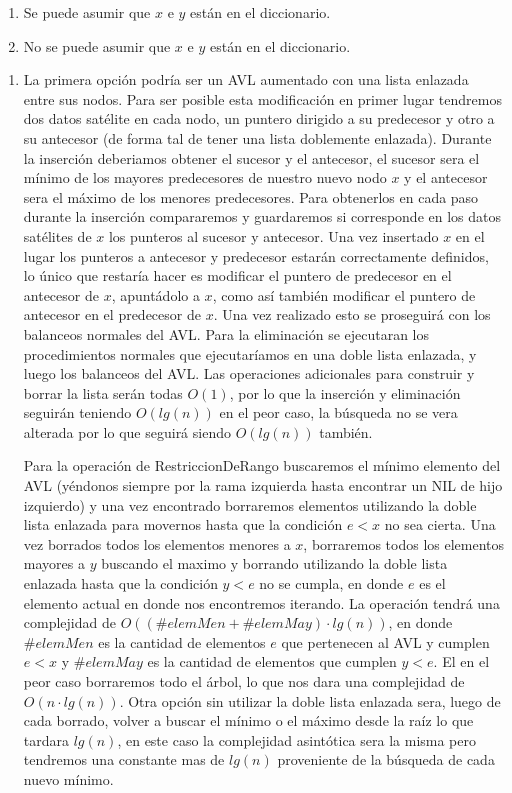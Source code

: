 \documentclass[10pt, a4paper]{article}
\begin{document}
\begin{enumerate}
 \item Se puede asumir que $x$ e $y$ est\'an en el diccionario. 
 \item No se puede asumir que $x$ e $y$ est\'an en el diccionario. 
\end{enumerate}

\begin{enumerate}
 \item La primera opci\'on podr\'ia ser un AVL aumentado con una lista enlazada entre sus nodos. Para ser posible esta modificaci\'on en primer lugar tendremos dos datos sat\'elite en cada nodo, un puntero dirigido a su predecesor y otro a su antecesor (de forma tal de tener una lista doblemente enlazada). Durante la inserci\'on deberiamos obtener el sucesor y el antecesor, el sucesor sera el m\'inimo de los mayores predecesores de nuestro nuevo nodo $x$ y el antecesor sera el m\'aximo de los menores predecesores. Para obtenerlos en cada paso durante la inserci\'on compararemos y guardaremos si corresponde en los datos sat\'elites de $x$ los punteros al sucesor y antecesor. Una vez insertado $x$ en el lugar los punteros a antecesor y predecesor estar\'an correctamente definidos, lo \'unico que restar\'ia hacer es modificar el puntero de predecesor en el antecesor de $x$, apunt\'adolo a $x$, como as\'i tambi\'en modificar el puntero de antecesor en el predecesor de $x$. Una vez realizado esto se proseguir\'a con los balanceos normales 
del 
AVL. Para la eliminaci\'on se ejecutaran los procedimientos normales que ejecutar\'iamos en una doble lista enlazada, y luego los balanceos del AVL. Las operaciones adicionales para construir y borrar la lista ser\'an todas $O(1)$, por lo que la inserci\'on y eliminaci\'on seguir\'an teniendo $O(lg(n))$ en el peor caso, la b\'usqueda no se vera alterada por lo que seguir\'a siendo $O(lg(n))$ tambi\'en. 
 
 Para la operaci\'on de RestriccionDeRango buscaremos el m\'inimo elemento del AVL (y\'endonos siempre por la rama izquierda hasta encontrar un NIL de hijo izquierdo) y una vez encontrado borraremos elementos utilizando la doble lista enlazada para movernos hasta que la condici\'on $e < x$ no sea cierta. Una vez borrados todos los elementos menores a $x$, borraremos todos los elementos mayores a $y$ buscando el maximo y borrando utilizando la doble lista enlazada hasta que la condici\'on $y < e$ no se cumpla, en donde $e$ es el elemento actual en donde nos encontremos iterando. La operaci\'on tendr\'a una complejidad de $O((\#elemMen + \#elemMay) \cdot lg(n))$, en donde $\#elemMen$ es la cantidad de elementos $e$ que pertenecen al AVL y cumplen $e < x$ y $\#elemMay$ es la cantidad de elementos que cumplen $y < e$. El en el peor caso borraremos todo el \'arbol, lo que nos dara una complejidad de $O(n \cdot lg(n))$. Otra opci\'on sin utilizar la doble lista enlazada sera, luego de cada borrado, volver a buscar el m\'inimo o el 
m\'aximo desde la ra\'iz lo que tardara $lg(n)$, en este caso la complejidad asint\'otica sera la misma pero tendremos una constante mas de $lg(n)$ proveniente de la b\'usqueda de cada nuevo m\'inimo.
 

\end{enumerate}
\end{document}

